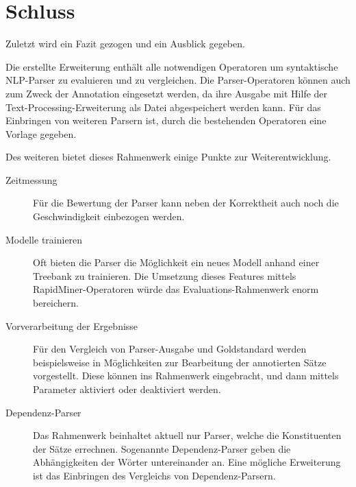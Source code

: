 %
\chapter{Schluss}
\label{sec:schluss}

Zuletzt wird ein Fazit gezogen und ein Ausblick gegeben.

Die erstellte Erweiterung enthält alle notwendigen Operatoren um syntaktische NLP-Parser zu evaluieren und zu vergleichen. Die Parser-Operatoren können auch zum Zweck der Annotation eingesetzt werden, da ihre Ausgabe mit Hilfe der Text-Processing-Erweiterung als Datei abgespeichert werden kann. Für das Einbringen von weiteren Parsern ist, durch die bestehenden Operatoren eine Vorlage gegeben.

Des weiteren bietet dieses Rahmenwerk einige Punkte zur Weiterentwicklung.
\begin{description}
\item[Zeitmessung]
Für die Bewertung der Parser kann neben der Korrektheit auch noch die Geschwindigkeit einbezogen werden. 
\item[Modelle trainieren]
Oft bieten die Parser die Möglichkeit ein neues Modell anhand einer Treebank zu trainieren. Die Umsetzung dieses Features mittels RapidMiner-Operatoren würde das Evaluations-Rahmenwerk enorm bereichern. 
\item[Vorverarbeitung der Ergebnisse]
Für den Vergleich von Parser-Ausgabe und Goldstandard werden beispielsweise in \cite{parseval} Möglichkeiten zur Bearbeitung der annotierten Sätze vorgestellt. Diese können ins Rahmenwerk eingebracht, und dann mittels Parameter aktiviert oder deaktiviert werden.
\item[Dependenz-Parser]
Das Rahmenwerk beinhaltet aktuell nur Parser, welche die Konstituenten der Sätze errechnen. Sogenannte Dependenz-Parser geben die Abhängigkeiten der Wörter untereinander an. Eine mögliche Erweiterung ist das Einbringen des Vergleichs von Dependenz-Parsern.
\end{description}